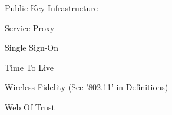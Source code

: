 \begin{acronym}
 {Public Key Infrastructure}



 {Service Proxy}

 {Single Sign-On}

 {Time To Live}


 {Wireless Fidelity (See '802.11' in Definitions)}

 {Web Of Trust}

\end{acronym}
